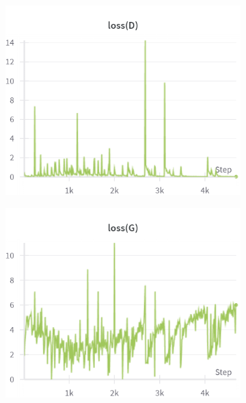 \begin{figure}[H]
    \centering

    \begin{subfigure}{0.45\textwidth}
        \centering
        \includegraphics[width=0.95\linewidth]{ngf/8/lossD.png}
        \caption{}
        \label{subfig:ngf/8/lossD}
    \end{subfigure}%
    \begin{subfigure}{0.45\textwidth}
        \centering
        \includegraphics[width=0.95\linewidth]{ngf/8/lossG.png}
        \caption{}
        \label{subfig:ngf/8/lossG}
    \end{subfigure}


\end{figure}
